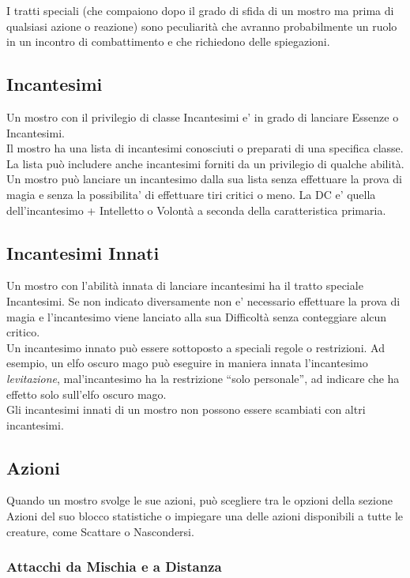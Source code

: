 I tratti speciali (che compaiono dopo il grado di sfida di un mostro ma prima di qualsiasi azione o reazione) sono peculiarità che avranno probabilmente un ruolo in un incontro di combattimento e che richiedono delle spiegazioni.

\subsection{Incantesimi}

Un mostro con il privilegio di classe Incantesimi e' in grado di lanciare Essenze o Incantesimi.\\
Il mostro ha una lista di incantesimi conosciuti o preparati di una specifica classe. La lista può includere anche incantesimi forniti da un privilegio di qualche abilità. \\
Un mostro può lanciare un incantesimo dalla sua lista senza effettuare la prova di magia e senza la possibilita' di effettuare tiri critici o meno. La DC e' quella dell'incantesimo + Intelletto o Volontà a seconda della caratteristica primaria.

\subsection{Incantesimi Innati}

Un mostro con l'abilità innata di lanciare incantesimi ha il tratto speciale Incantesimi.
Se non indicato diversamente non e' necessario effettuare la prova di magia e l'incantesimo viene lanciato alla sua Difficoltà senza conteggiare alcun critico.\\
Un incantesimo innato può essere sottoposto a speciali regole o restrizioni. Ad esempio, un elfo oscuro mago può eseguire in maniera innata l'incantesimo \emph{levitazione}, mal'incantesimo ha la  restrizione ``solo personale'', ad indicare che ha effetto solo
sull'elfo oscuro mago. \\
Gli incantesimi innati di un mostro non possono essere scambiati con altri incantesimi. 

\subsection{Azioni}

Quando un mostro svolge le sue azioni, può scegliere tra le opzioni della sezione Azioni del suo blocco statistiche o impiegare una delle azioni disponibili a tutte le creature, come Scattare o Nascondersi.

\subsubsection{Attacchi da Mischia e a Distanza}

